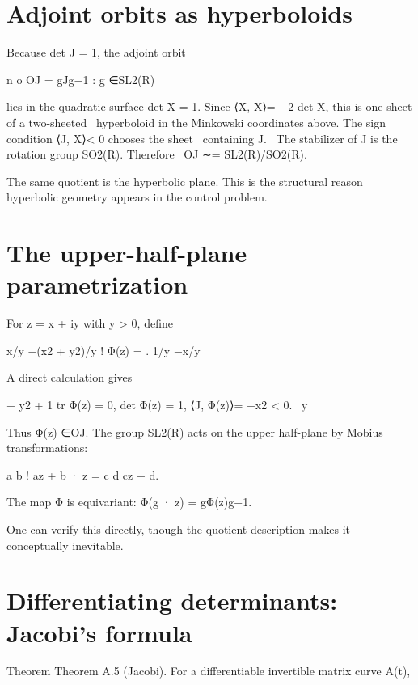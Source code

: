 \section{Adjoint orbits as hyperboloids}

Because det J = 1, the adjoint orbit


\begin{displaytext}
n o OJ = gJg−1 : g ∈SL2(R)
\end{displaytext}

\begin{displaytext}
lies in the quadratic surface det X = 1. Since ⟨X, X⟩= −2 det X, this is one sheet of a two-sheeted \
hyperboloid in the Minkowski coordinates above. The sign condition ⟨J, X⟩< 0 chooses the sheet \
containing J. \
The stabilizer of J is the rotation group SO2(R). Therefore \
OJ ∼= SL2(R)/SO2(R).
\end{displaytext}

The same quotient is the hyperbolic plane. This is the structural reason hyperbolic geometry appears in the control problem.


\section{The upper-half-plane parametrization}

For z = x + iy with y > 0, define


x/y −(x2 + y2)/y ! Φ(z) = . 1/y −x/y


A direct calculation gives


\begin{displaytext}
+ y2 + 1 tr Φ(z) = 0, det Φ(z) = 1, ⟨J, Φ(z)⟩= −x2 < 0. \
y
\end{displaytext}

Thus Φ(z) ∈OJ. The group SL2(R) acts on the upper half-plane by Mobius transformations:


a b ! az + b · z = c d cz + d.


The map Φ is equivariant: Φ(g · z) = gΦ(z)g−1.


One can verify this directly, though the quotient description makes it conceptually inevitable.


\section{Differentiating determinants: Jacobi’s formula}

\begin{statementbox}{Theorem}
Theorem A.5 (Jacobi). For a differentiable invertible matrix curve A(t),
\end{statementbox}

